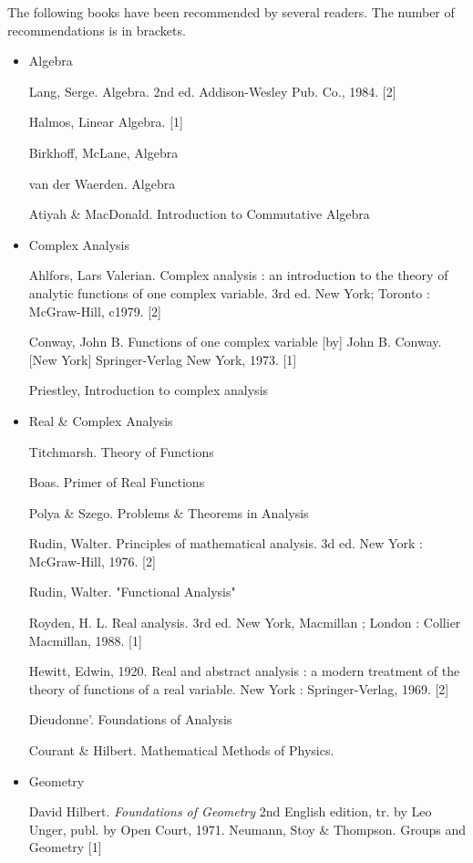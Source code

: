 
The following books have been recommended by several readers.
The number of recommendations is in brackets.

\begin{itemize}
\item Algebra

Lang, Serge. Algebra. 2nd ed. Addison-Wesley Pub. Co., 1984. [2]

Halmos, Linear Algebra. [1]

Birkhoff, McLane, Algebra

van der Waerden. Algebra

Atiyah \& MacDonald. Introduction to Commutative Algebra

\item Complex Analysis

Ahlfors, Lars Valerian. Complex analysis : an introduction to the
theory of analytic functions of one complex variable. 3rd ed. New
York; Toronto : McGraw-Hill, c1979. [2]

Conway, John B. Functions of one complex variable [by] John
B. Conway. [New York] Springer-Verlag New York, 1973. [1]

Priestley, Introduction to complex analysis


\item Real \& Complex Analysis

Titchmarsh. Theory of Functions 
  
Boas. Primer of Real Functions

  Polya \& Szego. Problems \& Theorems in Analysis

Rudin, Walter. Principles of mathematical analysis. 3d ed. New York :
McGraw-Hill, 1976. [2]

Rudin, Walter. "Functional Analysis"

Royden, H. L. Real analysis. 3rd ed. New York, Macmillan ; London :
Collier Macmillan, 1988. [1]

Hewitt, Edwin, 1920. Real and abstract analysis : a modern treatment
of the theory of functions of a real variable. New York :
Springer-Verlag, 1969. [2]

Dieudonne'. Foundations of Analysis

Courant \& Hilbert. Mathematical Methods of Physics.


\item Geometry

David Hilbert. {\em Foundations of Geometry}
  2nd English edition, tr. by Leo Unger, publ. by Open Court, 1971.
Neumann, Stoy \& Thompson. Groups and Geometry [1]


\end{itemize}
